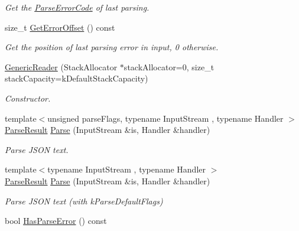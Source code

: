\begin{DoxyCompactItemize}
\begin{DoxyCompactList}\small\item\em Get the \hyperlink{group__RAPIDJSON__ERRORS_ga8d4b32dfc45840bca189ade2bbcb6ba7}{Parse\+Error\+Code} of last parsing. \end{DoxyCompactList}\item 
\mbox{\label{classGenericReader_ae9008523ccd06d839a57335835cb4091}} 
size\+\_\+t \hyperlink{classGenericReader_ae9008523ccd06d839a57335835cb4091}{Get\+Error\+Offset} () const
\begin{DoxyCompactList}\small\item\em Get the position of last parsing error in input, 0 otherwise. \end{DoxyCompactList}\item 
\hyperlink{classGenericReader_aab875a34b3092df9fb4e2b8eac6dbb96}{Generic\+Reader} (Stack\+Allocator $\ast$stack\+Allocator=0, size\+\_\+t stack\+Capacity=k\+Default\+Stack\+Capacity)
\begin{DoxyCompactList}\small\item\em Constructor. \end{DoxyCompactList}\item 
{\footnotesize template$<$unsigned parse\+Flags, typename Input\+Stream , typename Handler $>$ }\\\hyperlink{structParseResult}{Parse\+Result} \hyperlink{classGenericReader_a0c450620d14ff1824e58bb7bd9b42099}{Parse} (Input\+Stream \&is, Handler \&handler)
\begin{DoxyCompactList}\small\item\em Parse J\+S\+ON text. \end{DoxyCompactList}\item 
{\footnotesize template$<$typename Input\+Stream , typename Handler $>$ }\\\hyperlink{structParseResult}{Parse\+Result} \hyperlink{classGenericReader_a76d91e5fd8dfe48aea7dd6d8a51dd6dc}{Parse} (Input\+Stream \&is, Handler \&handler)
\begin{DoxyCompactList}\small\item\em Parse J\+S\+ON text (with k\+Parse\+Default\+Flags) \end{DoxyCompactList}\item 
\mbox{\label{classGenericReader_ac417441794477ea747b63adb6d3653a9}} 
bool \hyperlink{classGenericReader_ac417441794477ea747b63adb6d3653a9}{Has\+Parse\+Error} () const

\end{DoxyCompactItemize}
